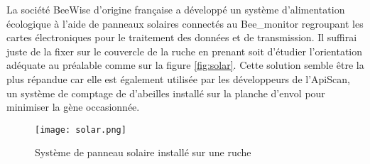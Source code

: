 La société BeeWise d'origine française a développé un système d'alimentation écologique à l'aide de panneaux solaires connectés au Bee_monitor regroupant les cartes électroniques pour le traitement des données et de transmission. Il suffirai juste de la fixer sur le couvercle de la ruche en prenant soit d'étudier l'orientation adéquate au préalable comme sur la figure \ref{fig:solar}. Cette solution semble être la plus répandue car elle est également utilisée par les développeurs de l'ApiScan, un système de comptage de d'abeilles installé sur la planche d'envol pour minimiser la gène occasionnée.    

\begin{figure}[h]
\centering\texttt{[image: solar.png]}
\caption{\label{fig:app} Système de panneau solaire installé sur une ruche}
\end{figure} 

   